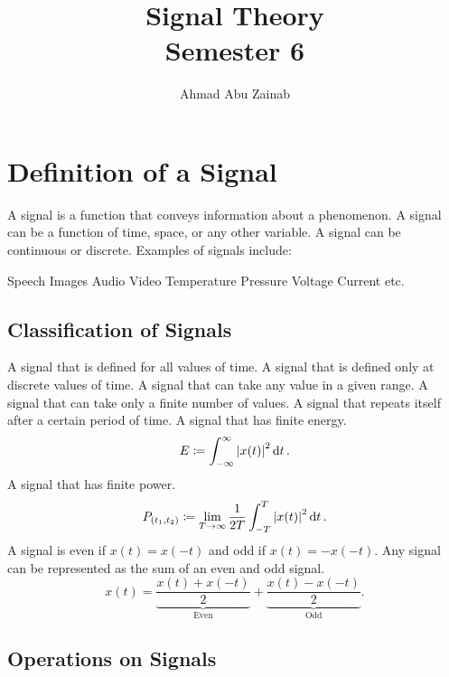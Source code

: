 \documentclass{report}
\title{\Huge{Signal Theory}\\Semester 6}
\author{\huge{Ahmad Abu Zainab}}
\date{}
\begin{document}
\maketitle
\newpage%
\tableofcontents
\pagebreak

\chapter{Definition of a Signal}

A signal is a function that conveys information about a phenomenon. A signal can be a function of time, space, or any other variable. A signal can be continuous or discrete.
Examples of signals include:
\begin{itemize}
	\ii Speech
	\ii Images
	\ii Audio
	\ii Video
	\ii Temperature
	\ii Pressure
	\ii Voltage
	\ii Current
	\ii etc.
\end{itemize}

\section{Classification of Signals}

\begin{description}
	 A signal that is defined for all values of time.
	 A signal that is defined only at discrete values of time.
	 A signal that can take any value in a given range.
	 A signal that can take only a finite number of values.
	 A signal that repeats itself after a certain period of time.
	 A signal that has finite energy.
	\[
		E \coloneq \int_{-\infty}^{\infty} \abs{x(t)}^2 \dd{t}
		.\]
	 A signal that has finite power.
	\[
		P_{(t_1,t_2)} \coloneq \lim_{T\to\infty} \frac{1}{2T} \int_{-T}^{T} \abs{x(t)}^2 \dd{t}
		.\]
	 A signal is even if $x(t) = x(-t)$ and odd if $x(t) = -x(-t)$. Any signal can be represented as the sum of an even and odd signal.
	\[
		x(t) = \underbrace{\frac{x(t) + x(-t)}{2}}_{\text{Even}} + \underbrace{\frac{x(t) - x(-t)}{2}}_{\text{Odd}}
		.\]
\end{description}

\section{Operations on Signals}
\end{document}
